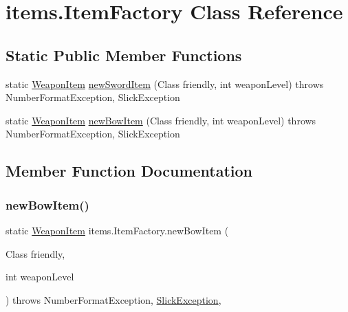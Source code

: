 \hypertarget{classitems_1_1_item_factory}{}\section{items.\+Item\+Factory Class Reference}
\label{classitems_1_1_item_factory}
\subsection*{Static Public Member Functions}
\begin{DoxyCompactItemize}
\item 
static \mbox{\hyperlink{classitems_1_1_weapon_item}{Weapon\+Item}} \mbox{\hyperlink{classitems_1_1_item_factory_abb755482bc46d97e59fa015d2a87a630}{new\+Sword\+Item}} (Class friendly, int weapon\+Level)  throws Number\+Format\+Exception, Slick\+Exception 
\item 
static \mbox{\hyperlink{classitems_1_1_weapon_item}{Weapon\+Item}} \mbox{\hyperlink{classitems_1_1_item_factory_a1cdf8d06be10362a07e285cdd0765a2d}{new\+Bow\+Item}} (Class friendly, int weapon\+Level)  throws Number\+Format\+Exception, Slick\+Exception 
\end{DoxyCompactItemize}


\subsection{Member Function Documentation}
\mbox{\label{classitems_1_1_item_factory_a1cdf8d06be10362a07e285cdd0765a2d}} 
\subsubsection{\texorpdfstring{new\+Bow\+Item()}{newBowItem()}}
{\footnotesize\ttfamily static \mbox{\hyperlink{classitems_1_1_weapon_item}{Weapon\+Item}} items.\+Item\+Factory.\+new\+Bow\+Item (\begin{DoxyParamCaption}\item[{Class}]{friendly,  }\item[{int}]{weapon\+Level }\end{DoxyParamCaption}) throws Number\+Format\+Exception, \mbox{\hyperlink{classorg_1_1newdawn_1_1slick_1_1_slick_exception}{Slick\+Exception}}\hspace{0.3cm}{\ttfamily [inline]}, {\ttfamily [static]}}


